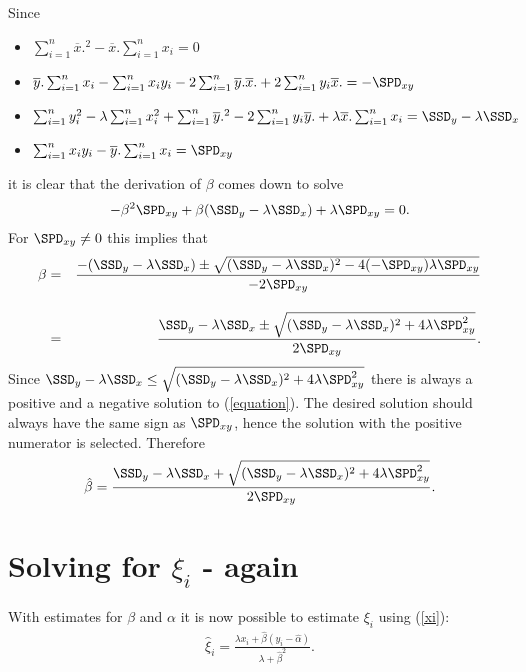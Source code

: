 \documentclass[a4paper,twoside,12pt]{article}
\begin{document}
Since 
\begin{itemize}
\item
$\sum_{i=1}^n\overline{x}.^2
-\overline{x}.\sum_{i=1}^nx_i=0$
\item
$\overline{y}.\sum_{i=1}^nx_i
-\sum_{i=1}^nx_iy_i
-2\sum_{i=1}^n\overline{y}.\overline{x}.
+2\sum_{i=1}^ny_i\overline{x}.=-\SPD_{xy}$
\item
$\sum_{i=1}^ny_i^2
-\lambda\sum_{i=1}^nx_i^2
+\sum_{i=1}^n\overline{y}.^2
-2\sum_{i=1}^ny_i\overline{y}.
+\lambda\overline{x}.\sum_{i=1}^nx_i
=\SSD_y-\lambda\SSD_x$
\item
$\sum_{i=1}^nx_iy_i
-\overline{y}.\sum_{i=1}^nx_i=\SPD_{xy}$
\end{itemize}
it is clear that the derivation of $\beta$ comes down to solve
\begin{eqnarray}\label{equation}
-\beta^2\SPD_{xy}+\beta(\SSD_y-\lambda\SSD_x)+\lambda\SPD_{xy}=0.
\end{eqnarray}
For $\SPD_{xy}\neq 0$ this implies that
\begin{eqnarray*}
\beta
&=&
\frac{-(\SSD_y-\lambda\SSD_x)\pm\sqrt{(\SSD_y-\lambda\SSD_x)^2-4(-\SPD_{xy})\lambda\SPD_{xy}}}{-2\SPD_{xy}}\\[1em]
&=&
\frac{\SSD_y-\lambda\SSD_x\pm\sqrt{(\SSD_y-\lambda\SSD_x)^2+4\lambda\SPD_{xy}^2}}{2\SPD_{xy}}.
\end{eqnarray*}
Since $\SSD_y-\lambda\SSD_x\leq
\sqrt{(\SSD_y-\lambda\SSD_x)^2+4\lambda\SPD_{xy}^2}$ there is always a
positive and a negative solution to (\ref{equation}). The desired solution should always have the same sign as $\SPD_{xy}$, hence the solution with the positive numerator is selected. Therefore 
\begin{eqnarray*}
\hat{\beta}=\frac{\SSD_y-\lambda\SSD_x+\sqrt{(\SSD_y-\lambda\SSD_x)^2+4\lambda\SPD_{xy}^2}}{2\SPD_{xy}}.
\end{eqnarray*}



\section{Solving for $\xi_i$ - again}
With estimates for $\beta$ and $\alpha$ it is now possible to estimate $\xi_i$ using (\ref{xi}):
\begin{eqnarray*}
\hat{\xi}_i=\frac{\lambda x_i+\hat{\beta}(y_i-\hat{\alpha})}{\lambda+\hat{\beta}^2}.
\end{eqnarray*}
\end{document}
